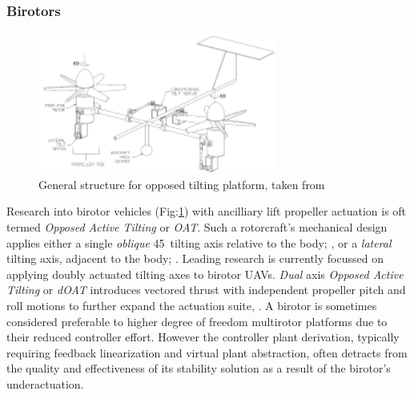\subsubsection*{Birotors}
\begin{figure}[hbtp]
\centering
\includegraphics[width=0.7\textwidth]{figs/dualaxistilt}
\caption{General structure for opposed tilting platform, taken from\cite{gres2007}}
\label{fig:dualaxistilt}
\end{figure}
Research into birotor vehicles (Fig:\ref{fig:dualaxistilt}) with ancilliary lift propeller actuation is oft termed \emph{Opposed Active Tilting} or \emph{OAT}. Such a rotorcraft's mechanical design applies either a single \emph{oblique} 45\textdegree ~tilting axis relative to the body; \cite{smalltwotilting,obliquepitch,passiveobliquetilting}, or a \emph{lateral} tilting axis, adjacent to the body; \cite{tiltrotorUAV,adaptivebackstep,tiltrotorcontrol,tpheonix}. Leading research is currently focussed on applying doubly actuated tilting axes to birotor UAVs. \emph{Dual} axis \emph{Opposed Active Tilting} or \emph{dOAT} introduces vectored thrust with independent propeller pitch and roll motions to further expand the actuation suite, \cite{gres2007,opposedlateraldualaxis}. A birotor is sometimes considered preferable to higher degree of freedom multirotor platforms due to their reduced controller effort. However the controller plant derivation, typically requiring feedback linearization and virtual plant abstraction, often detracts from the quality and effectiveness of its stability solution as a result of the birotor's underactuation. 
\par
